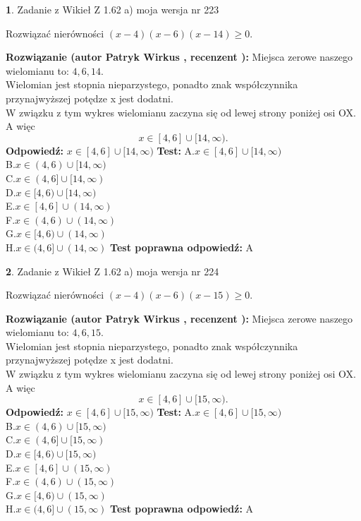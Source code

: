 \documentclass[12pt, a4paper]{article}
\theoremstyle{definition} %
\newtheorem{zad}{}
\newcommand{\zadStart}[1]{\begin{zad}#1\newline}
\newcommand{\zadStop}{\end{zad}}
\newcommand{\rozwStart}[2]{\noindent \textbf{Rozwiązanie (autor #1 , recenzent #2): }\newline}
\newcommand{\rozwStop}{\newline}
\newcommand{\odpStart}{\noindent \textbf{Odpowiedź:}\newline}
\newcommand{\odpStop}{\newline}
\newcommand{\testStart}{\noindent \textbf{Test:}\newline}
\newcommand{\testStop}{\newline}
\newcommand{\kluczStart}{\noindent \textbf{Test poprawna odpowiedź:}\newline}
\newcommand{\kluczStop}{\newline}
\begin{document}
\zadStart{Zadanie z Wikieł Z 1.62 a) moja wersja nr 223}

Rozwiązać nierówności $(x-4)(x-6)(x-14)\ge0$.
\zadStop
\rozwStart{Patryk Wirkus}{}
Miejsca zerowe naszego wielomianu to: $4, 6, 14$.\\
Wielomian jest stopnia nieparzystego, ponadto znak współczynnika przy\linebreak najwyższej potędze x jest dodatni.\\ W związku z tym wykres wielomianu zaczyna się od lewej strony poniżej osi OX. A więc $$x \in [4,6] \cup [14,\infty).$$
\rozwStop
\odpStart
$x \in [4,6] \cup [14,\infty)$
\odpStop
\testStart
A.$x \in [4,6] \cup [14,\infty)$\\
B.$x \in (4,6) \cup [14,\infty)$\\
C.$x \in (4,6] \cup [14,\infty)$\\
D.$x \in [4,6) \cup [14,\infty)$\\
E.$x \in [4,6] \cup (14,\infty)$\\
F.$x \in (4,6) \cup (14,\infty)$\\
G.$x \in [4,6) \cup (14,\infty)$\\
H.$x \in (4,6] \cup (14,\infty)$
\testStop
\kluczStart
A
\kluczStop



\zadStart{Zadanie z Wikieł Z 1.62 a) moja wersja nr 224}

Rozwiązać nierówności $(x-4)(x-6)(x-15)\ge0$.
\zadStop
\rozwStart{Patryk Wirkus}{}
Miejsca zerowe naszego wielomianu to: $4, 6, 15$.\\
Wielomian jest stopnia nieparzystego, ponadto znak współczynnika przy\linebreak najwyższej potędze x jest dodatni.\\ W związku z tym wykres wielomianu zaczyna się od lewej strony poniżej osi OX. A więc $$x \in [4,6] \cup [15,\infty).$$
\rozwStop
\odpStart
$x \in [4,6] \cup [15,\infty)$
\odpStop
\testStart
A.$x \in [4,6] \cup [15,\infty)$\\
B.$x \in (4,6) \cup [15,\infty)$\\
C.$x \in (4,6] \cup [15,\infty)$\\
D.$x \in [4,6) \cup [15,\infty)$\\
E.$x \in [4,6] \cup (15,\infty)$\\
F.$x \in (4,6) \cup (15,\infty)$\\
G.$x \in [4,6) \cup (15,\infty)$\\
H.$x \in (4,6] \cup (15,\infty)$
\testStop
\kluczStart
A
\kluczStop
\end{document}
